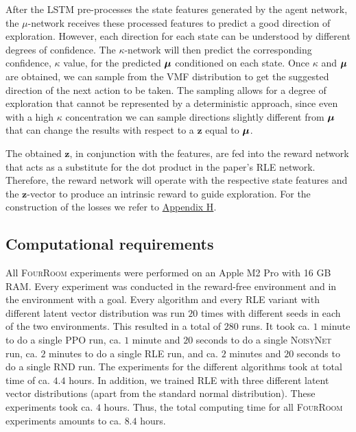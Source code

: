 \documentclass[10pt]{article} %
\begin{document}
After the LSTM pre-processes the state features generated by the agent network, the $\mu$-network receives these processed features to predict a good direction of exploration. However, each direction for each state can be understood by different degrees of confidence. The $\kappa$-network will then predict the corresponding confidence, $\kappa$ value, for the predicted ${\bm{\mu}}$ conditioned on each state. Once $\kappa$ and ${\bm{\mu}}$ are obtained, we can sample from the VMF distribution to get the suggested direction of the next action to be taken.  The sampling allows for a degree of exploration that cannot be represented by a deterministic approach, since even with a high $\kappa$ concentration we can sample directions slightly different from ${\bm{\mu}}$ that can change the results with respect to a $\mathbf{z}$ equal to ${\bm{\mu}}$.  

The obtained $\mathbf{z}$, in conjunction with the features, are fed into the reward network that acts as a substitute for the dot product in the paper's \textsc{RLE} network. Therefore, the reward network will operate with the respective state features and the $\mathbf{z}$-vector to produce an intrinsic reward to guide exploration. For the construction of the losses we refer to \hyperlink{na-vmf}{Appendix H}.

\hypertarget{computational-requirements}{\subsection{Computational requirements}}

All \textsc{FourRoom} experiments were performed on an Apple M2 Pro with 16 GB RAM. Every experiment was conducted in the reward-free environment and in the environment with a goal. Every algorithm and every \textsc{RLE} variant with different latent vector distribution was run $20$ times with different seeds in each of the two environments. This resulted in a total of $280$ runs. It took ca. $1$ minute to do a single \textsc{PPO} run, ca. $1$ minute and $20$ seconds to do a single \textsc{NoisyNet} run, ca. $2$ minutes to do a single \textsc{RLE} run, and ca. $2$ minutes and $20$ seconds to do a single \textsc{RND} run. The experiments for the different algorithms took at total time of ca. $4.4$ hours. In addition, we trained \textsc{RLE} with three different latent vector distributions (apart from the standard normal distribution). These experiments took ca. $4$ hours. Thus, the total computing time for all \textsc{FourRoom} experiments amounts to ca. $8.4$ hours.
\end{document}
